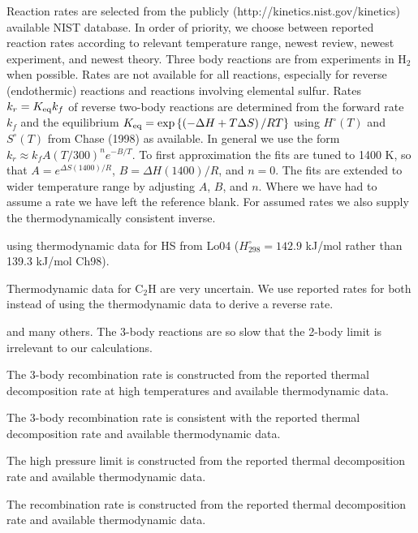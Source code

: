 \documentclass[12pt,landscape]{article}
\newcounter{reaction}
\begin{document}
\newpage


 Reaction rates are selected from the publicly (http://kinetics.nist.gov/kinetics) available NIST database.
In order of priority, we choose between reported reaction rates according to relevant temperature range, newest review, newest experiment, and newest theory.  
Three body reactions are from experiments in H$_2$ when possible.  
Rates are not available for all reactions, especially for reverse (endothermic) reactions and reactions involving elemental sulfur.
Rates $k_r=K_{\rm eq}k_f$ of reverse two-body reactions are determined from the forward rate $k_f$ and the equilibrium $K_{\rm eq}=\exp{\left\{\left(-\Delta H + T\Delta S\right)/RT\right\}}$ using $H^{\circ}(T)$ and $S^{\circ}(T)$ from Chase (1998) as available.  In general we use the form $k_r \approx k_f A \left(T/300\right)^n e^{-B/T}$.  To first approximation the fits are tuned to 1400 K, so that $A=e^{\Delta S(1400)/R}$, $B=\Delta H(1400)/R$, and $n=0$.  The fits are extended to wider temperature range by adjusting $A$, $B$, and $n$.
Where we have had to assume a rate we have left the reference blank.
For assumed rates we also supply the thermodynamically consistent inverse.

using thermodynamic data for HS from Lo04 ($H_{298}^{\circ}=142.9$ kJ/mol rather than 139.3 kJ/mol Ch98). 

Thermodynamic data for C$_2$H are very uncertain.  We use reported rates for both instead of using the thermodynamic data to derive a reverse rate. 



 and many others.  The 3-body reactions are so slow that the 2-body limit is irrelevant to our calculations.

 The 3-body recombination rate is constructed from the reported thermal decomposition rate at high temperatures and available thermodynamic data. 

 The 3-body recombination rate is consistent with the reported thermal decomposition rate and available thermodynamic data. 

 The high pressure limit is constructed from the reported thermal decomposition rate and available thermodynamic data. 

 The recombination rate is constructed from the reported thermal decomposition rate and available thermodynamic data. 
\end{document}
